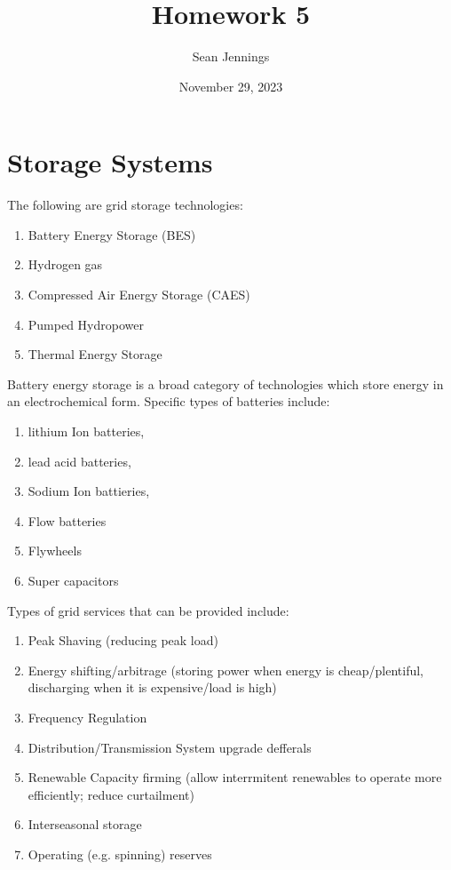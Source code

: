 \documentclass{homework}
\title{Homework 5}
\author{Sean Jennings}
\date{November 29, 2023}
\begin{document}
\maketitle

\section{Storage Systems}

\begin{letterenum}
    \item The following are grid storage technologies:
    \begin{enumerate}
        \item Battery Energy Storage (BES)
        \item Hydrogen gas
        \item Compressed Air Energy Storage (CAES)
        \item Pumped Hydropower
        \item Thermal Energy Storage
    \end{enumerate}

    Battery energy storage is a broad category of technologies which store
    energy in an electrochemical form. Specific types of batteries include:
    \begin{enumerate}
        \item lithium Ion batteries,
        \item lead acid batteries,
        \item Sodium Ion battieries,
        \item Flow batteries
        \item Flywheels
        \item Super capacitors
    \end{enumerate}

    Types of grid services that can be provided include:
    \begin{enumerate}
        \item Peak Shaving (reducing peak load)
        \item Energy shifting/arbitrage (storing power when energy is cheap/plentiful,
            discharging when it is expensive/load is high)
        \item Frequency Regulation
        \item Distribution/Transmission System upgrade defferals
        \item Renewable Capacity firming (allow interrmitent renewables to operate
            more efficiently; reduce curtailment)
        \item Interseasonal storage
        \item Operating (e.g. spinning) reserves
    \end{enumerate}


\end{letterenum}
\end{document}

